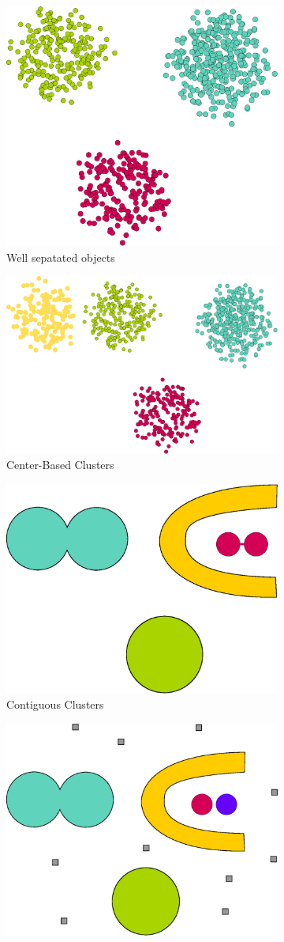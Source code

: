 \begin{figure}[h]
\centering
\begin{subfigure}{.5\textwidth}
  \centering
  \includegraphics[width=.5\linewidth]{img/wellSeparatedObjects.eps}
  \caption{Well sepatated objects}
  \label{fig:wellSeparatedObjects}
\end{subfigure}%
\begin{subfigure}{.5\textwidth}
  \centering
  \includegraphics[width=.5\linewidth]{img/centerBasedClusters.eps}
  \caption{Center-Based Clusters}
  \label{fig:centerBasedClusters}
\end{subfigure}%
\vspace*{0.5cm} 
\begin{subfigure}{.5\textwidth}
  \centering
  \includegraphics[width=.5\linewidth]{img/contiguousClusters.eps}
  \caption{Contiguous Clusters}
  \label{fig:contiguousClusters}
\end{subfigure}%
\begin{subfigure}{.5\textwidth}
  \centering
  \includegraphics[width=.5\linewidth]{img/densityClusters.eps}

\end{subfigure}
\end{figure}
